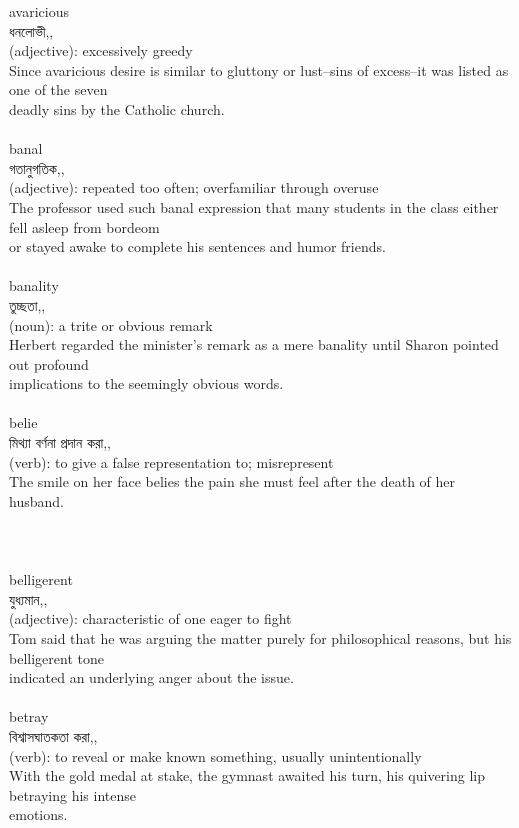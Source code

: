 \documentclass{article}
\begin{document}
{avaricious}\\
{ধনলোভী,,}\\
{(adjective): excessively greedy\\Since avaricious desire is similar to gluttony or lust--sins of excess--it was listed as one of the seven\\deadly sins by the Catholic church.\\}\\
{banal}\\
{গতানুগতিক,,}\\
{(adjective): repeated too often; overfamiliar through overuse\\The professor used such banal expression that many students in the class either fell asleep from bordeom\\or stayed awake to complete his sentences and humor friends.\\}\\
{banality}\\
{তুচ্ছতা,,}\\
{(noun): a trite or obvious remark\\Herbert regarded the minister's remark as a mere banality until Sharon pointed out profound\\implications to the seemingly obvious words.\\}\\
{belie}\\
{মিথ্যা বর্ণনা প্রদান করা,,}\\
{(verb): to give a false representation to; misrepresent\\The smile on her face belies the pain she must feel after the death of her husband.\\\\                                                                               \\}\\
{belligerent}\\
{যুধ্যমান,,}\\
{(adjective): characteristic of one eager to fight\\Tom said that he was arguing the matter purely for philosophical reasons, but his belligerent tone\\indicated an underlying anger about the issue.\\}\\
{betray}\\
{বিশ্বাসঘাতকতা করা,,}\\
{(verb): to reveal or make known something, usually unintentionally\\With the gold medal at stake, the gymnast awaited his turn, his quivering lip betraying his intense\\emotions.\\}\\
\end{document}
